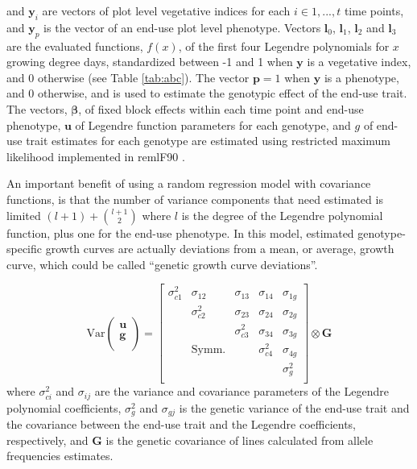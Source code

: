 \documentclass[12pt, letterpaper]{article}
\begin{document}
\noindent and $\mathbf{y}_i$ are vectors of plot level vegetative indices for each $i \in {1, ..., t}$ time points, and $\mathbf{y}_p$ is the vector of an end-use plot level phenotype. Vectors $\mathbf{l}_0$, $\mathbf{l}_1$, $\mathbf{l}_2$ and $\mathbf{l}_3$ are the evaluated functions, $f(x)$, of the first four Legendre polynomials for $x$ growing degree days, standardized between -1 and 1 when $\mathbf{y}$ is a vegetative index, and 0 otherwise (see Table \ref{tab:abc}). The vector $\mathbf{p} = 1$ when $\mathbf{y}$ is a phenotype, and 0 otherwise, and is used to estimate the genotypic effect of the end-use trait. The vectors, $\boldsymbol \beta$, of fixed block effects within each time point and end-use phenotype, $\mathbf{u}$ of Legendre function parameters for each genotype, and $g$ of end-use trait estimates for each genotype are estimated using restricted maximum likelihood implemented in remlF90 \parencite{misztal2002}.

An important benefit of using a random regression model with covariance functions, is that the number of variance components that need estimated is limited $(l+1) + \binom{l+1}{2}$ where $l$ is the degree of the Legendre polynomial function, plus one for the end-use phenotype. In this model, estimated genotype-specific growth curves are actually deviations from a mean, or average, growth curve, which could be called ``genetic growth curve deviations''.



\begin{equation}
 \text{Var}\begin{pmatrix}
    \mathbf{u} \\
    \mathbf{g} \\
  \end{pmatrix} = \begin{bmatrix}
    \sigma^2_{c1} & \sigma_{12} & \sigma_{13} & \sigma_{14} & \sigma_{1g} \\
     & \sigma^2_{c2} & \sigma_{23} & \sigma_{24} & \sigma_{2g} \\
     & & \sigma^2_{c3} & \sigma_{34} & \sigma_{3g} \\
     & \text{Symm.} & & \sigma^2_{c4} & \sigma_{4g} \\
     & & & & \sigma^2_{g} \\
  \end{bmatrix} \otimes \mathbf{G}
\end{equation}
\noindent where $\sigma^2_{ci}$ and $\sigma_{ij}$ are the variance and covariance parameters of the Legendre polynomial coefficients, $\sigma^2_{g}$ and $\sigma_{gj}$ is the genetic variance of the end-use trait and the covariance between the end-use trait and the Legendre coefficients, respectively, and $\mathbf{G}$ is the genetic covariance of lines calculated from allele frequencies estimates. 
\end{document}
